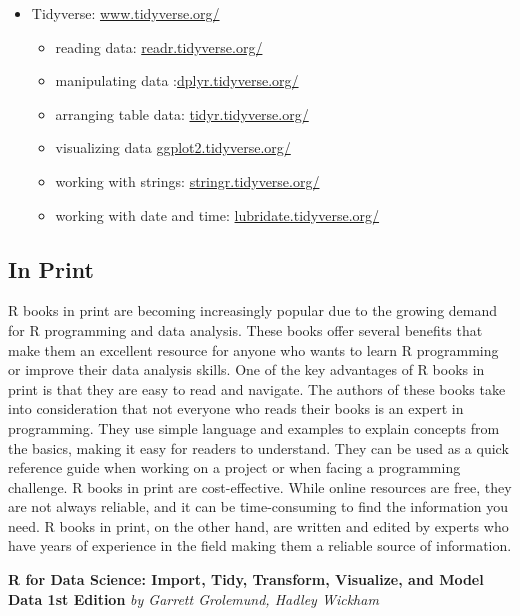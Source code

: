 \documentclass[
]{book}
\begin{document}
\begin{itemize}
\item
  Tidyverse: \href{https://www.tidyverse.org/}{www.tidyverse.org/}

  \begin{itemize}
  \item
    reading data: \href{https://readr.tidyverse.org/}{readr.tidyverse.org/}
  \item
    manipulating data :\href{https://dplyr.tidyverse.org/}{dplyr.tidyverse.org/}
  \item
    arranging table data: \href{https://tidyr.tidyverse.org/}{tidyr.tidyverse.org/}
  \item
    visualizing data \href{https://ggplot2.tidyverse.org/}{ggplot2.tidyverse.org/}
  \item
    working with strings: \href{https://stringr.tidyverse.org/}{stringr.tidyverse.org/}
  \item
    working with date and time: \href{https://lubridate.tidyverse.org/}{lubridate.tidyverse.org/}
  \end{itemize}
\end{itemize}

\hypertarget{in-print}{%
\subsection*{In Print}\label{in-print}}

R books in print are becoming increasingly popular due to the growing demand for R programming and data analysis. These books offer several benefits that make them an excellent resource for anyone who wants to learn R programming or improve their data analysis skills. One of the key advantages of R books in print is that they are easy to read and navigate. The authors of these books take into consideration that not everyone who reads their books is an expert in programming. They use simple language and examples to explain concepts from the basics, making it easy for readers to understand. They can be used as a quick reference guide when working on a project or when facing a programming challenge. R books in print are cost-effective. While online resources are free, they are not always reliable, and it can be time-consuming to find the information you need. R books in print, on the other hand, are written and edited by experts who have years of experience in the field making them a reliable source of information.

\textbf{R for Data Science: Import, Tidy, Transform, Visualize, and Model Data 1st Edition}
\emph{by Garrett Grolemund, Hadley Wickham}
\end{document}
